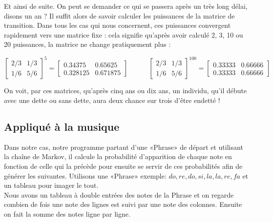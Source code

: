 \documentclass[12pt, a4paper]{article}
\begin{document}
            Et ainsi de suite. On peut se demander ce qui se passera après un très long délai, disons un an ? Il suffit alors de savoir calculer les puissances de la matrice de transition. Dans tous les cas qui nous concernent, ces puissances convergent rapidement vers une matrice fixe : cela signifie qu’après avoir calculé 2, 3, 10 ou 20 puissances, la matrice ne change pratiquement plus :
            
            \begin{center}
                $
                \begin{bmatrix}
                    2/3 & 1/3\\
                    1/6 & 5/6
                \end{bmatrix}^5
                =
                \begin{bmatrix}
                    0.34375 & 0.65625\\
                    0.328125 & 0.671875
                \end{bmatrix}
                \hspace{3em}
                \begin{bmatrix}
                    2/3 & 1/3\\
                    1/6 & 5/6
                \end{bmatrix}^{100}
                =
                \begin{bmatrix}
                    0.33333 & 0.66666\\
                    0.33333 & 0.66666
                \end{bmatrix}
                $
            \end{center}
            
            On voit, par ces matrices, qu’après cinq ans ou dix ans, un individu, qu’il débute avec une dette ou sans dette, aura deux chance sur trois d’être endetté !
        
        
        \subsection{Appliqué à la musique}
        
            Dans notre cas, notre programme partant d’une «Phrase» de départ et utilisant la chaîne de Markov, il calcule la probabilité d’apparition de chaque note en fonction de celle qui la précède pour ensuite se servir de ces probabilités afin de générer les suivantes.
Utilisons une «Phrase» exemple:  $do, re, do, si, la, la, re, fa$ et un tableau pour imager le tout.\\
Nous avons un tableau à double entrées des notes de la Phrase et on regarde combien de fois une note des lignes est suivi par une note des colonnes. Ensuite on fait la somme des notes ligne par ligne.
            
\end{document}
